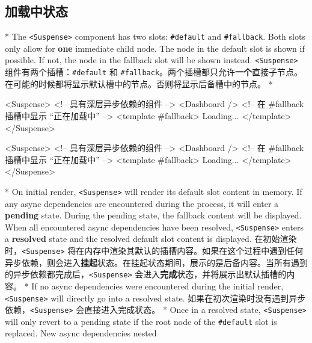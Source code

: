 \begin{paracol}{2}
\subsection{加载中状态}
\switchcolumn[0]*%
The \texttt{\textless{}Suspense\textgreater{}} component has two slots:
\texttt{\#default} and \texttt{\#fallback}. Both slots only allow for
\textbf{one} immediate child node. The node in the default slot is shown
if possible. If not, the node in the fallback slot will be shown
instead.
\switchcolumn
\texttt{\textless{}Suspense\textgreater{}}
组件有两个插槽：\texttt{\#default} 和
\texttt{\#fallback}。两个插槽都只允许\textbf{一个}直接子节点。在可能的时候都将显示默认槽中的节点。否则将显示后备槽中的节点。
\switchcolumn[0]*%
\begin{codeHtml}
<Suspense>
  <!-- 具有深层异步依赖的组件 -->
  <Dashboard />
  <!-- 在 #fallback 插槽中显示 “正在加载中” -->
  <template #fallback>
    Loading...
  </template>
</Suspense>
\end{codeHtml}
\switchcolumn
\begin{codeHtml}
<Suspense>
  <!-- 具有深层异步依赖的组件 -->
  <Dashboard />
  <!-- 在 #fallback 插槽中显示 “正在加载中” -->
  <template #fallback>
    Loading...
  </template>
</Suspense>
\end{codeHtml}
\switchcolumn[0]*%
On initial render, \texttt{\textless{}Suspense\textgreater{}} will
render its default slot content in memory. If any async dependencies are
encountered during the process, it will enter a \textbf{pending} state.
During the pending state, the fallback content will be displayed. When
all encountered async dependencies have been resolved,
\texttt{\textless{}Suspense\textgreater{}} enters a \textbf{resolved}
state and the resolved default slot content is displayed.
\switchcolumn
在初始渲染时，\texttt{\textless{}Suspense\textgreater{}}
将在内存中渲染其默认的插槽内容。如果在这个过程中遇到任何异步依赖，则会进入\textbf{挂起}状态。在挂起状态期间，展示的是后备内容。当所有遇到的异步依赖都完成后，\texttt{\textless{}Suspense\textgreater{}}
会进入\textbf{完成}状态，并将展示出默认插槽的内容。
\switchcolumn[0]*%
If no async dependencies were encountered during the initial render,
\texttt{\textless{}Suspense\textgreater{}} will directly go into a
resolved state.
\switchcolumn
如果在初次渲染时没有遇到异步依赖，\texttt{\textless{}Suspense\textgreater{}}
会直接进入完成状态。
\switchcolumn[0]*%
Once in a resolved state, \texttt{\textless{}Suspense\textgreater{}}
will only revert to a pending state if the root node of the
\texttt{\#default} slot is replaced. New async dependencies nested

\end{paracol}
